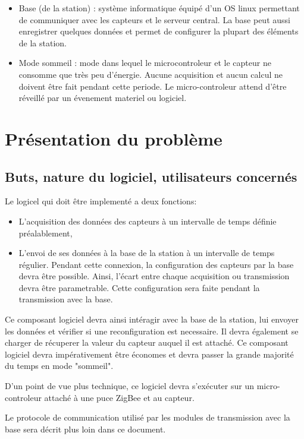 \begin{itemize}
\item Base (de la station) : système informatique équipé d'un OS linux permettant de communiquer avec les capteurs et le serveur central. La base peut aussi enregistrer quelques données et permet de configurer la plupart des éléments de la station.
\item Mode sommeil : mode dans lequel le microcontroleur et le capteur ne consomme que très peu d'énergie. Aucune acquisition et aucun calcul ne doivent être fait pendant cette periode. Le micro-controleur attend d'être réveillé par un évenement materiel ou logiciel.
\end{itemize}

\section{Présentation du problème}

\subsection{Buts, nature du logiciel, utilisateurs concernés}

Le logicel qui doit être implementé a deux fonctions:
\begin{itemize}
\item L'acquisition des données des capteurs à un intervalle de temps définie préalablement,
\item L'envoi de ses données à la base de la station à un intervalle de temps régulier. Pendant cette connexion, la configuration des capteurs par la base devra être possible. Ainsi, l'écart entre chaque acquisition ou transmission devra être parametrable. Cette configuration sera faite pendant la transmission avec la base.
\end{itemize}

Ce composant logiciel devra ainsi intéragir avec la base de la station, lui envoyer les données et vérifier si une reconfiguration est necessaire. Il devra également se charger de récuperer la valeur du capteur auquel il est attaché. Ce composant logiciel devra impérativement être économes et devra passer la grande majorité du temps en mode "sommeil".

D'un point de vue plus technique, ce logiciel devra s'exécuter sur un micro-controleur attaché à une puce ZigBee et au capteur.

Le protocole de communication utilisé par les modules de transmission avec la base sera décrit plus loin dans ce document.

